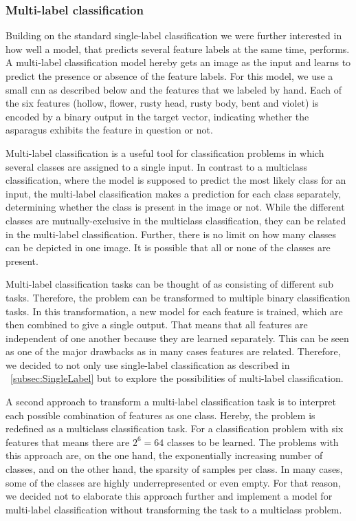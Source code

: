 \subsubsection{Multi-label classification}
\label{subsec:MultiLabel}

Building on the standard single-label classification we were further interested in how well a model, that predicts several feature labels at the same time, performs. A multi-label classification model hereby gets an image as the input and learns to predict the presence or absence of the feature labels.
For this model, we use a small  \acrshort{cnn} as described below and the features that we labeled by hand. Each of the six features (hollow, flower, rusty head, rusty body, bent and violet) is encoded by a binary output in the target vector, indicating whether the asparagus exhibits the feature in question or not.

\bigskip
Multi-label classification is a useful tool for classification problems in which several classes are assigned to a single input. In contrast to a multiclass classification, where the model is supposed to predict the most likely class for an input, the multi-label classification makes a prediction for each class separately, determining whether the class is present in the image or not. While the different classes are mutually-exclusive in the multiclass classification, they can be related in the multi-label classification. Further, there is no limit on how many classes can be depicted in one image. It is possible that all or none of the classes are present.

Multi-label classification tasks can be thought of as consisting of different sub tasks. Therefore, the problem can be transformed to multiple binary classification tasks. In this transformation, a new model for each feature is trained, which are then combined to give a single output. That means that all features are independent of one another because they are learned separately. This can be seen as one of the major drawbacks as in many cases features are related.
Therefore, we decided to not only use single-label classification as described in ~\autoref{subsec:SingleLabel} but to explore the possibilities of multi-label classification.

A second approach to transform a multi-label classification task is to interpret each possible combination of features as one class. Hereby, the problem is redefined as a multiclass classification task. For a classification problem with six features that means there are \(2^{6} = 64\) classes to be learned. The problems with this approach are, on the one hand, the exponentially increasing number of classes, and on the other hand, the sparsity of samples per class. In many cases, some of the classes are highly underrepresented or even empty. For that reason, we decided not to elaborate this approach further and implement a model for multi-label classification without transforming the task to a multiclass problem.

